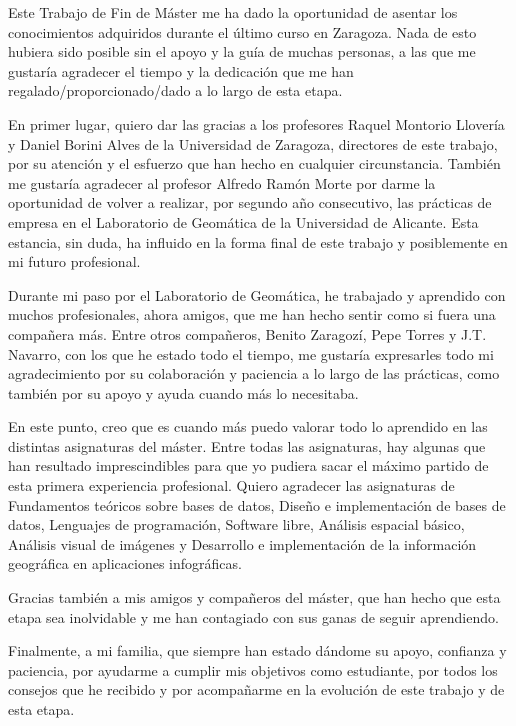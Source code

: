 
\begin{acknowledgements}      

Este Trabajo de Fin de Máster me ha dado la oportunidad de asentar los conocimientos adquiridos durante el último curso en Zaragoza. Nada de esto hubiera sido posible sin el apoyo y la guía de muchas personas, a las que me gustaría agradecer el tiempo y la dedicación que me han regalado/proporcionado/dado a lo largo de esta etapa.

En primer lugar, quiero dar las gracias a los profesores Raquel Montorio Llovería y Daniel Borini Alves de la Universidad de Zaragoza, directores de este trabajo, por su atención y el esfuerzo que han hecho en cualquier circunstancia. También me gustaría agradecer al profesor Alfredo Ramón Morte por darme la oportunidad de volver a realizar, por segundo año consecutivo, las prácticas de empresa en el Laboratorio de Geomática de la Universidad de Alicante. Esta estancia, sin duda, ha influido en la forma final de este trabajo y posiblemente en mi futuro profesional.

Durante mi paso por el Laboratorio de Geomática, he trabajado y aprendido con muchos profesionales, ahora amigos, que me han hecho sentir como si fuera una compañera más. Entre otros compañeros, Benito Zaragozí, Pepe Torres y J.T. Navarro, con los que he estado todo el tiempo, me gustaría expresarles todo mi agradecimiento por su colaboración y paciencia a lo largo de las prácticas, como también por su apoyo y ayuda cuando más lo necesitaba.

En este punto, creo que es cuando más puedo valorar todo lo aprendido en las distintas asignaturas del máster. Entre todas las asignaturas, hay algunas que han resultado imprescindibles para que yo pudiera sacar el máximo partido de esta primera experiencia profesional. Quiero agradecer  las asignaturas de Fundamentos teóricos sobre bases de datos, Diseño e implementación de bases de datos, Lenguajes de programación, Software libre, Análisis espacial básico, Análisis visual de imágenes y Desarrollo e implementación de la información geográfica en aplicaciones infográficas.

Gracias también a mis amigos y compañeros del máster, que han hecho que esta etapa sea inolvidable y me han contagiado con sus ganas de seguir aprendiendo.

Finalmente, a mi familia, que siempre han estado dándome su apoyo, confianza y paciencia, por ayudarme a cumplir mis objetivos como estudiante, por todos los consejos que he recibido y por acompañarme en la evolución de este trabajo y de esta etapa.


  

\end{acknowledgements}
